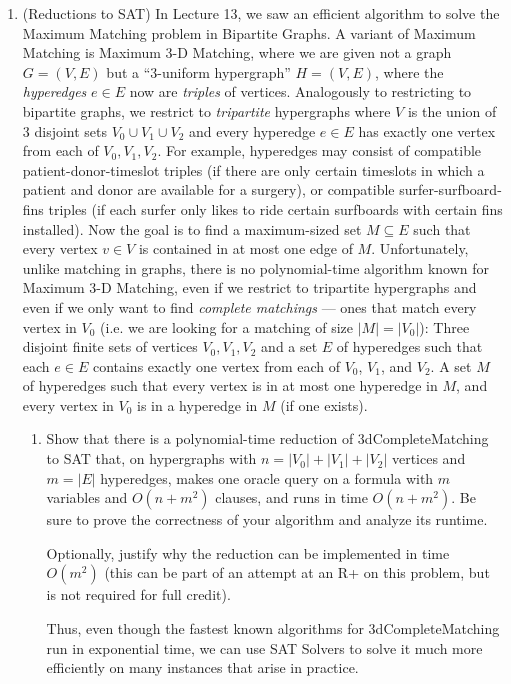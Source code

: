 \documentclass[11pt]{article}
\begin{document}
\begin{enumerate}
\item (Reductions to SAT) In Lecture 13, we saw an efficient algorithm to solve the Maximum Matching problem in Bipartite Graphs. A variant of Maximum Matching is Maximum 3-D Matching, where we are given not a graph $G=(V,E)$ but a ``3-uniform hypergraph'' $H=(V,E)$, where the {\em hyperedges} $e\in E$ now are {\em triples} of vertices.  
Analogously to restricting to bipartite graphs, we restrict to {\em tripartite} hypergraphs where $V$ is the union of 3 disjoint sets $V_0\cup V_1 \cup V_2$ and every hyperedge $e\in E$ has exactly one vertex from each of $V_0,V_1,V_2$. For example, hyperedges may consist of 
compatible patient-donor-timeslot triples (if there are only certain timeslots in which a patient and donor are available for a surgery), 
or compatible surfer-surfboard-fins triples (if each surfer only likes to ride certain surfboards with certain fins installed).
Now the goal is to find a maximum-sized set $M\subseteq E$ such that every vertex $v\in V$ is contained in at most one edge of $M$.  
Unfortunately, unlike matching in graphs, there is no polynomial-time algorithm known for Maximum 3-D Matching, even if we restrict to tripartite hypergraphs and even if we only want to find {\em complete matchings} --- ones that match every vertex in $V_0$ (i.e. we are looking for a matching of size $|M|=|V_0|$):
{Three disjoint finite sets of vertices $V_0,V_1,V_2$ and a set $E$ of hyperedges  such that each $e\in E$ contains exactly one vertex from each of $V_0$, $V_1$, and $V_2$.}
{A set $M$ of hyperedges such that every vertex is in at most one hyperedge in $M$, and every vertex in $V_0$ is in a hyperedge in $M$ (if one exists).
}
\begin{enumerate}
\item Show that there is a polynomial-time reduction of 3dCompleteMatching to SAT that, on hypergraphs with $n=|V_0|+|V_1|+|V_2|$ vertices and $m=|E|$ hyperedges, makes one oracle query on a formula with $m$ variables and $O(n + m^2)$ clauses, and runs in time $O(n + m^2)$.  Be sure to prove the correctness of your algorithm and analyze its runtime. 

Optionally, justify why the reduction can be implemented in time $O(m^2)$ (this can be part of an attempt at an R+ on this problem, but is not required for full credit).

Thus, even though the fastest known algorithms for 3dCompleteMatching run in exponential time, we can use SAT Solvers to solve it much more efficiently on many instances that arise in practice. 



\end{enumerate}
\end{enumerate}
\end{document}
